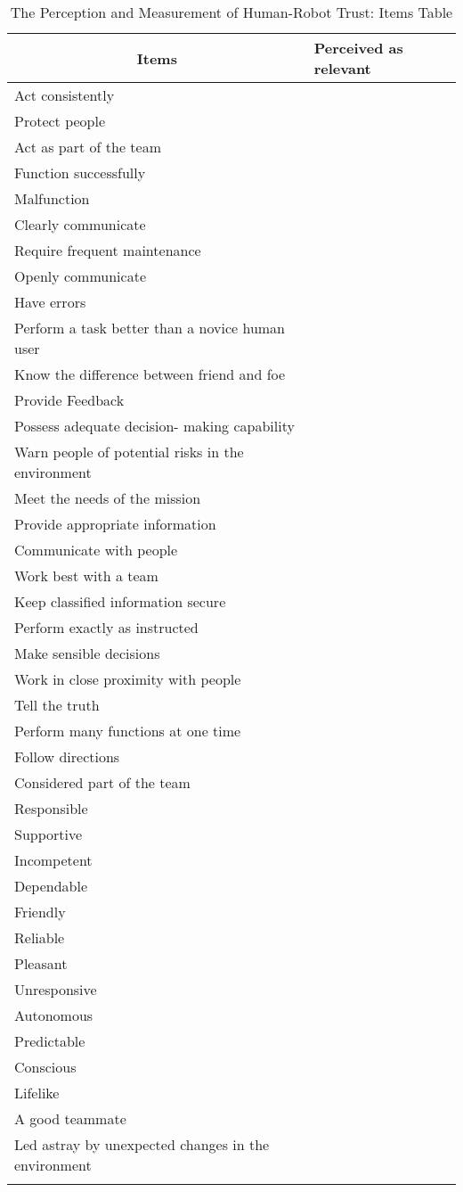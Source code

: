 \begin{longtable}{l|l}
	\multicolumn{1}{c|}{\textbf{Items}} & \textbf{Perceived as relevant} \\ \hline
	\endhead
	Act consistently & \\ \hline
	Protect people & \\ \hline
	Act as part of the team & \\ \hline
	Function successfully & \\ \hline
	Malfunction & \\ \hline
	Clearly communicate & \\ \hline
	Require frequent maintenance & \\ \hline
	Openly communicate & \\ \hline
	Have errors & \\ \hline
	Perform a task better than a novice human user & \\ \hline
	Know the difference between friend and foe & \\ \hline
	Provide Feedback & \\ \hline
	Possess adequate decision- making capability & \\ \hline
	Warn people of potential risks in the environment & \\ \hline
	Meet the needs of the mission & \\ \hline
	Provide appropriate information & \\ \hline
	Communicate with people & \\ \hline
	Work best with a team & \\ \hline
	Keep classified information secure & \\ \hline
	Perform exactly as instructed & \\ \hline
	Make sensible decisions & \\ \hline
	Work in close proximity with people & \\ \hline
	Tell the truth & \\ \hline
	Perform many functions at one time & \\ \hline
	Follow directions & \\ \hline
	Considered part of the team & \\ \hline
	Responsible & \\ \hline
	Supportive & \\ \hline
	Incompetent & \\ \hline
	Dependable & \\ \hline
	Friendly & \\ \hline
	Reliable & \\ \hline
	Pleasant & \\ \hline
	Unresponsive & \\ \hline
	Autonomous & \\ \hline
	Predictable & \\ \hline
	Conscious & \\ \hline
	Lifelike & \\ \hline
	A good teammate & \\ \hline
	Led astray by unexpected changes in the environment & \\
	\caption{The Perception and Measurement of Human-Robot Trust: Items Table}
	\label{app:measurement.items.table}	
\end{longtable}

